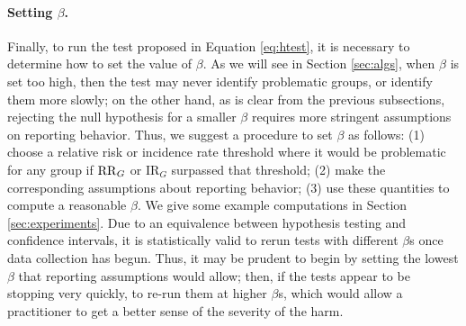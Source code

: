 \paragraph{Setting $\beta$.} Finally, to run the test proposed in Equation \eqref{eq:htest}, it is necessary to determine how to set the value of $\beta$. As we will see in Section \ref{sec:algs}, when $\beta$ is set too high, then the test may never identify problematic groups, or identify them more slowly; on the other hand, as is clear from the previous subsections, rejecting the null hypothesis for a smaller $\beta$ requires more stringent assumptions on reporting behavior. Thus, we suggest a procedure to set $\beta$ as follows: (1) choose a relative risk or incidence rate threshold where it would be problematic for any group if $\mathrm{RR}_G$ or $\mathrm{IR}_G$ surpassed that threshold; (2) make the corresponding assumptions about reporting behavior; (3) use these quantities to compute a reasonable $\beta$.
We give some example computations in Section \ref{sec:experiments}. 
Due to an equivalence between hypothesis testing and confidence intervals, it is statistically valid to rerun tests with different $\beta$s once data collection has begun. Thus, it may be prudent to begin by setting the lowest $\beta$ that reporting assumptions would allow; then, if the tests appear to be stopping very quickly, to re-run them at higher $\beta$s, which would allow a practitioner to get a better sense of the severity of the harm.

